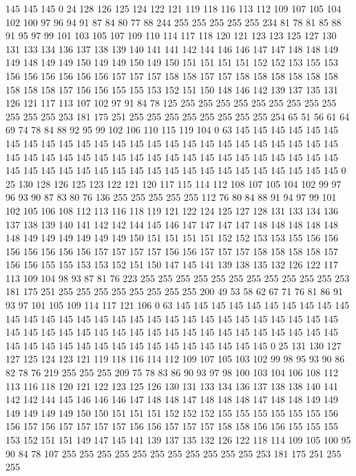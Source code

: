 145 145 145 0 24 128 126 125 124 122 121 119 118 116 113 112 109 107 105 104
102 100 97 96 94 91 87 84 80 77 88 244 255 255 255 255 255 234 81 78
81 85 88 91 95 97 99 101 103 105 107 109 110 114 117 118 120 121 123 123
125 127 130 131 133 134 136 137 138 139 140 141 141 142 144 146 146 147 147 148
148 149 149 148 149 149 150 149 149 150 149 150 151 151 151 151 152 152 153 155
153 156 156 156 156 156 156 157 157 157 158 158 157 157 158 158 158 158 158 158
158 158 158 157 156 156 155 155 153 152 151 150 148 146 142 139 137 135 131 126
121 117 113 107 102 97 91 84 78 125 255 255 255 255 255 255 255 255 255 255
255 255 253 181 175 251 255 255 255 255 255 255 255 255 254 65 51 56 61 64
69 74 78 84 88 92 95 99 102 106 110 115 119 104 0 63 145 145 145 145
145 145 145 145 145 145 145 145 145 145 145 145 145 145 145 145 145 145 145 145
145 145 145 145 145 145 145 145 145 145 145 145 145 145 145 145 145 145 145 145
145 145 145 145 145 145 145 145 145 145 145 145 145 145 145 145 145 145 145 0
25 130 128 126 125 123 122 121 120 117 115 114 112 108 107 105 104 102 99 97
96 93 90 87 83 80 76 136 255 255 255 255 255 112 76 80 84 88 91 94
97 99 101 102 105 106 108 112 113 116 118 119 121 122 124 125 127 128 131 133
134 136 137 138 139 140 141 142 142 144 145 146 147 147 147 147 148 148 148 148
148 148 149 149 149 149 149 149 150 151 151 151 151 152 152 153 153 155 156 156
156 156 156 156 156 157 157 157 157 156 156 157 157 157 158 158 158 158 157 156
156 155 155 153 153 152 151 150 147 145 141 139 138 135 132 126 122 117 113 109
104 98 93 87 81 76 223 255 255 255 255 255 255 255 255 255 255 255 253 181
175 251 255 255 255 255 255 255 255 255 200 49 53 58 62 67 71 76 81 86
91 93 97 101 105 109 114 117 121 106 0 63 145 145 145 145 145 145 145 145
145 145 145 145 145 145 145 145 145 145 145 145 145 145 145 145 145 145 145 145
145 145 145 145 145 145 145 145 145 145 145 145 145 145 145 145 145 145 145 145
145 145 145 145 145 145 145 145 145 145 145 145 145 145 145 0 25 131 130 127
127 125 124 123 121 119 118 116 114 112 109 107 105 103 102 99 98 95 93 90
86 82 78 76 219 255 255 255 209 75 78 83 86 90 93 97 98 100 103 104
106 108 112 113 116 118 120 121 122 123 125 126 130 131 133 134 136 137 138 138
140 141 142 142 144 145 146 146 146 147 148 148 147 148 148 148 147 148 148 149
149 149 149 149 149 150 150 151 151 151 152 152 152 155 155 155 155 155 155 156
156 157 156 157 157 157 157 156 156 157 157 157 158 158 156 156 155 155 155 153
152 151 151 149 147 145 141 139 137 135 132 126 122 118 114 109 105 100 95 90
84 78 107 255 255 255 255 255 255 255 255 255 255 255 253 181 175 251 255 255
